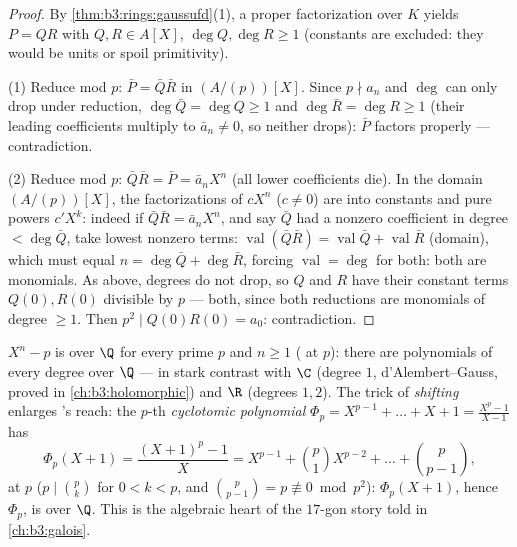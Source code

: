 \begin{proof}
By \cref{thm:b3:rings:gaussufd}(1), a proper factorization over
$K$ yields $P = QR$ with $Q, R \in A[X]$, $\deg Q, \deg R \geq 1$
(constants are excluded: they would be units or spoil
primitivity).

(1) Reduce mod $p$: $\bar P = \bar Q\bar R$ in $(A/(p))[X]$. Since
$p \nmid a_n$ and $\deg$ can only drop under reduction, $\deg \bar
Q = \deg Q \geq 1$ and $\deg\bar R = \deg R \geq 1$ (their leading
coefficients multiply to $\bar a_n \neq 0$, so neither drops):
$\bar P$ factors properly --- contradiction.

(2) Reduce mod $p$: $\bar Q \bar R = \bar P = \bar a_n X^n$ (all
lower coefficients die). In the domain $(A/(p))[X]$, the
factorizations of $cX^n$ ($c \ne 0$) are into constants and pure
powers $c'X^k$: indeed if $\bar Q\bar R = \bar a_nX^n$, and say
$\bar Q$ had a nonzero coefficient in degree $< \deg\bar Q$, take
lowest nonzero terms: $\operatorname{val}(\bar Q\bar R) =
\operatorname{val}\bar Q + \operatorname{val}\bar R$ (domain),
which must equal $n = \deg\bar Q + \deg\bar R$, forcing
$\operatorname{val} = \deg$ for both: both are monomials. As
above, degrees do not drop, so $Q$ and $R$ have their constant
terms $Q(0), R(0)$ divisible by $p$ --- both, since both
reductions are monomials of degree $\geq 1$. Then $p^2 \mid
Q(0)R(0) = a_0$: contradiction.
\end{proof}

\begin{example}\label{ex:b3:rings:eisenstein}
$X^n - p$ is  over $\Q$ for every prime $p$ and $n
\geq 1$ ( at $p$): there are  polynomials of
every degree over $\Q$ --- in stark contrast with $\C$ (degree
$1$, d'Alembert--Gauss, proved in \cref{ch:b3:holomorphic}) and
$\R$ (degrees $1, 2$). The trick of \emph{shifting} enlarges
's reach: the $p$-th \emph{cyclotomic
polynomial} $\Phi_p = X^{p-1} +
\dots + X + 1 = \frac{X^p - 1}{X - 1}$ has
\[
\Phi_p(X + 1) = \frac{(X+1)^p - 1}{X}
= X^{p-1} + \binom{p}{1}X^{p-2} + \dots + \binom{p}{p-1},
\]
 at $p$ ($p \mid \binom pk$ for $0 < k < p$, and
$\binom{p}{p-1} = p \not\equiv 0 \bmod p^2$): $\Phi_p(X+1)$, hence
$\Phi_p$, is  over $\Q$. This is the algebraic heart of
the $17$-gon story told in \cref{ch:b3:galois}.
\end{example}

